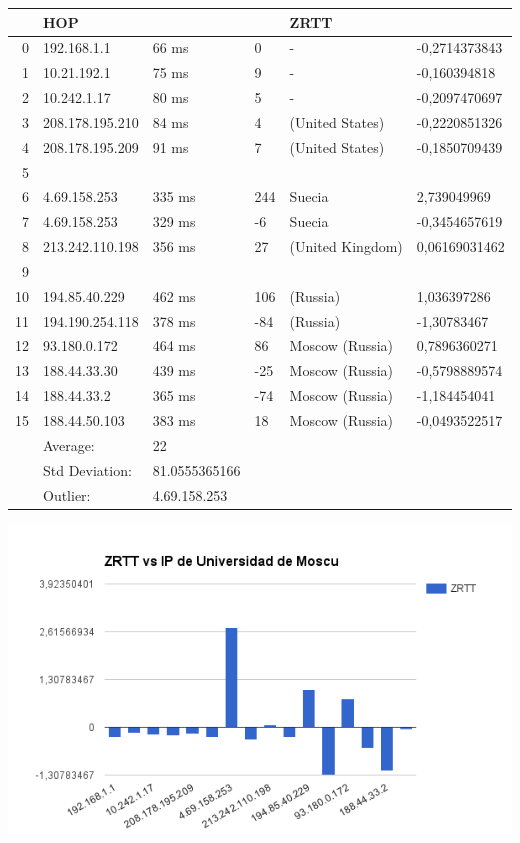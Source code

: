 \begin{tabular}{|r|l|l|l|l|l|}
\hline
 & HOP & & & ZRTT \\
\hline
0 &	192.168.1.1 & 66 ms & 0 & - & -0,2714373843 \\
1 &	10.21.192.1 & 75 ms & 9 & - & -0,160394818 \\
2 &	10.242.1.17 & 80 ms & 5 & - & -0,2097470697 \\
3 &	208.178.195.210 & 84 ms & 4 & (United States) & -0,2220851326 \\
4 &	208.178.195.209 & 91 ms & 7 & (United States) & -0,1850709439 \\
5 & & & & & \\
6 &	4.69.158.253 & 335 ms & 244 & Suecia & 2,739049969 \\
7 &	4.69.158.253 & 329 ms & -6 & Suecia & -0,3454657619 \\
8 &	213.242.110.198 & 356 ms & 27 & (United Kingdom) & 0,06169031462 \\
9 & & & & & \\
10 &	194.85.40.229 & 462 ms & 106 & (Russia) & 1,036397286 \\
11 &	194.190.254.118 & 378 ms & -84 & (Russia) & -1,30783467 \\
12 &	93.180.0.172 & 464 ms & 86 & Moscow (Russia) & 0,7896360271 \\
13 &	188.44.33.30 & 439 ms & -25 & Moscow (Russia) & -0,5798889574 \\
14 &	188.44.33.2 & 365 ms & -74 & Moscow (Russia) & -1,184454041 \\
15 &	188.44.50.103 & 383 ms & 18 & Moscow (Russia) & -0,0493522517 \\
\hline
 & Average: & 22 & & & \\
 & Std Deviation: & 81.0555365166 & & & \\
 & Outlier: & 4.69.158.253 & & & \\
\hline
\end{tabular}

\begin{center}
\includegraphics[width=\textwidth]{imgs/moscu.png}
\end{center}



